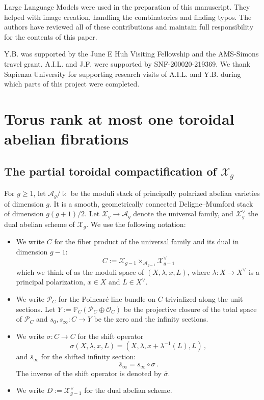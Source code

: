 \documentclass[11pt]{article}
\def\CO{\mathcal{O}}
\def\A{\mathcal{A}}
\def\P{\mathcal{P}}
\def\X{\mathcal{X}}
\def\PP{\mathbb{P}}
\newcommand{\sbar}{\overline{s}}
\newcommand{\sh}{\sigma}
\newcommand{\shb}{\overline{\sh}}
\theoremstyle{definition}
\begin{document}
Large Language Models were used in the preparation of this manuscript. They helped with image creation, handling the combinatorics and finding typos. The authors have reviewed all of these contributions and maintain full responsibility for the contents of this paper.

Y.B. was supported by the June E Huh Visiting Fellowship and the AMS-Simons travel grant. A.I.L. and J.F. were supported by SNF-200020-219369. We thank Sapienza University for supporting research visits of A.I.L. and Y.B. during which parts of this project were completed.


\section{Torus rank at most one toroidal abelian fibrations}\label{sec:tr1}

\subsection{The partial toroidal compactification of $\X_g$}\label{sec:mum}

For $g\ge 1$, let $\A_g/\Bbbk$ be the moduli stack of principally polarized abelian varieties of dimension $g$. It is a smooth, geometrically connected Deligne--Mumford stack of dimension $g(g+1)/2$. Let $\X_g \to \A_g$ denote the universal family, and $\X_g^\vee$ the dual abelian scheme of $\X_g$. We use the following notation:

\begin{itemize}
    \item We write $C$ for the fiber product of the universal family and its dual in dimension $g-1$:
    $$
    C := \X_{g-1} \times_{\A_{g-1}} \X_{g-1}^\vee
    $$
    which we think of as the moduli space of $(X, \lambda, x, L)$, where $\lambda: X \to X^\vee$ is a principal polarization, $x \in X$ and $L \in X^\vee$.
    \item We write $\P_C$ for the Poincar\'e line bundle on $C$ trivialized along the unit sections. Let $Y :=\PP_C(\P_C \oplus\CO_C)$ be the projective closure of the total space of $\P_C$ and $s_0, s_\infty : C \to Y$ be the zero and the infinity sections.
    \item We write $\sh : C \to C$ for the shift operator
    \begin{equation}\label{eq:sh}
        \sh (X, \lambda, x, L)=(X, \lambda, x + \lambda^{-1}(L), L)\,,
    \end{equation}
    and $\sbar_{\infty}$ for the shifted infinity section:
    $$
    \sbar_{\infty} = s_{\infty}\circ \sh\,.
    $$
    The inverse of the shift operator is denoted by $\shb$.
    \item We write $D:=\X_{g-1}^\vee$ for the dual abelian scheme.
\end{itemize}
\end{document}
